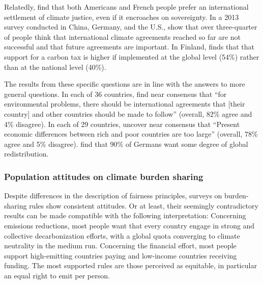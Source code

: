 \documentclass[12pt,english]{article}
\begin{document}
Relatedly, \citet{meilland_international_2023} find that both Americans and French people prefer an international settlement of climate justice, even if it encroaches on sovereignty. In a 2013 survey conducted in China, Germany, and the U.S., \citet{schleich_citizens_2016} show that over three-quarter of people think that international climate agreements reached so far are not successful and that future agreements are important. %
In Finland, \citet{sivonen_attitudes_2022} finds that that support for a carbon tax is higher if implemented at the global level (54\%) rather than at the national level (40\%).

The results from these specific questions are in line with the answers to more general questions. In each of 36 countries, \citet{issp_international_2010} find near consensus that ``for environmental problems, there should be international agreements that [their country] and other countries should be made to follow'' (overall, 82\% agree and 4\% disagree). %
In each of 29 countries, \citet{issp_international_2019} uncover near consensus that ``Present economic differences between rich and poor countries are too large'' (overall, 78\% agree and 5\% disagree). \citet{fehr_your_2022} find that 90\% of Germans want some degree of global redistribution. %


\subsubsection{Population attitudes on climate burden sharing}\label{subsubsec:literature_attitudes_burden_sharing}

Despite differences in the description of fairness principles, surveys on burden-sharing rules show consistent attitudes. Or at least, their seemingly contradictory results can be made compatible with the following interpretation: 
Concerning emissions reductions, most people want that every country engage in strong and collective decarbonization efforts, with a global quota converging to climate neutrality in the medium run. Concerning the financial effort, most people support high-emitting countries paying and low-income countries receiving funding. The most supported rules are those perceived as equitable, in particular an equal right to emit per person. 
\end{document}
